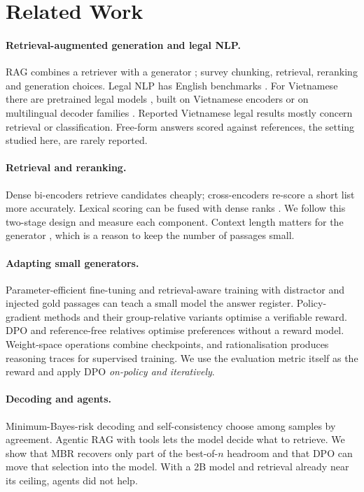 \documentclass[11pt,a4paper]{article}
\begin{document}
\section{Related Work}
\paragraph{Retrieval-augmented generation and legal NLP.}
RAG combines a retriever with a generator \cite{lewis2020rag}; \cite{rag_survey} survey chunking, retrieval, reranking and generation choices. Legal NLP has English benchmarks \cite{lexglue,legalbench}. For Vietnamese there are pretrained legal models \cite{vilegallm}, built on Vietnamese encoders \cite{phobert} or on multilingual decoder families \cite{qwen25,qwen3}. Reported Vietnamese legal results mostly concern retrieval or classification. Free-form answers scored against references, the setting studied here, are rarely reported.
\paragraph{Retrieval and reranking.}
Dense bi-encoders \cite{dpr,sbert,bgem3} retrieve candidates cheaply; cross-encoders \cite{monobert} re-score a short list more accurately. Lexical scoring \cite{bm25} can be fused with dense ranks \cite{rrf}. We follow this two-stage design and measure each component. Context length matters for the generator \cite{lostmiddle}, which is a reason to keep the number of passages small.
\paragraph{Adapting small generators.}
Parameter-efficient fine-tuning \cite{lora,pissa} and retrieval-aware training with distractor and injected gold passages \cite{raft} can teach a small model the answer register. Policy-gradient methods \cite{ppo,instructgpt} and their group-relative variants \cite{grpo,r1} optimise a verifiable reward. DPO \cite{dpo} and reference-free relatives \cite{simpo} optimise preferences without a reward model. Weight-space operations \cite{soups,taskarith} combine checkpoints, and rationalisation \cite{star} produces reasoning traces for supervised training. We use the evaluation metric itself as the reward and apply DPO \emph{on-policy and iteratively}.
\paragraph{Decoding and agents.}
Minimum-Bayes-risk decoding \cite{mbr,freitag} and self-consistency \cite{selfcons} choose among samples by agreement. Agentic RAG with tools \cite{react,selfrag,searchr1} lets the model decide what to retrieve. We show that MBR recovers only part of the best-of-$n$ headroom and that DPO can move that selection into the model. With a 2B model and retrieval already near its ceiling, agents did not help.
\end{document}
